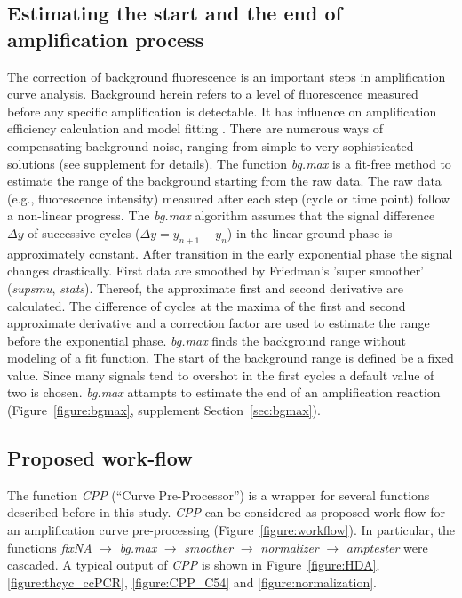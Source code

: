 \documentclass[twocolumn]{bmcart}%
\begin{document}
\subsection*{Estimating the start and the end of amplification process}

  The correction of background fluorescence is an important steps in 
amplification curve analysis. Background herein refers to a level of 
fluorescence measured before any specific amplification is detectable. It has 
influence on amplification efficiency calculation and model fitting 
\cite{tuomi_2010, rutledge_2008, ruijter_2009}. There are numerous ways of 
compensating background noise, ranging from simple to very sophisticated 
solutions (see supplement for details). The function 
\textsl{bg.max} is a fit-free method to estimate the range of the background 
starting from the raw data. The raw data (e.g., fluorescence intensity) measured 
after each step (cycle or time point) follow a non-linear progress. The 
\textsl{bg.max} algorithm assumes that the signal difference $\Delta{y}$ of 
successive cycles ($\Delta{y} = y_{n + 1} - y_n$) in the linear ground phase is 
approximately constant. After transition in the early exponential phase the 
signal changes drastically. First data are smoothed by Friedman’s ’super 
smoother’ (\textsl{supsmu}, \emph{stats}). Thereof, the approximate first and 
second derivative are calculated. The difference of cycles at the maxima of the 
first and second approximate derivative and a correction factor are used to 
estimate the range before the exponential phase. \textsl{bg.max} finds the 
background range without modeling of a fit function. The start of the background 
range is defined be a fixed value. Since many signals tend to overshot in the 
first cycles a default value of two is chosen. \textsl{bg.max} attampts to 
estimate the end of an amplification reaction (Figure~\ref{figure:bgmax}, 
supplement Section~\ref{sec:bgmax}).

\subsection*{Proposed work-flow}

The function \textsl{CPP} (``Curve Pre-Processor'') is a wrapper for several 
functions described before in this study. \textsl{CPP} can be considered as 
proposed work-flow for an amplification curve pre-processing 
(Figure~\ref{figure:workflow}). In particular, the functions \textsl{fixNA} 
$\rightarrow$ \textsl{bg.max} $\rightarrow$ \textsl{smoother} $\rightarrow$ 
\textsl{normalizer} $\rightarrow$ \textsl{amptester} were cascaded. A typical 
output of \textsl{CPP} is shown in Figure~\ref{figure:HDA}, 
\ref{figure:thcyc_ccPCR}, \ref{figure:CPP_C54} and \ref{figure:normalization}.
\end{document}
